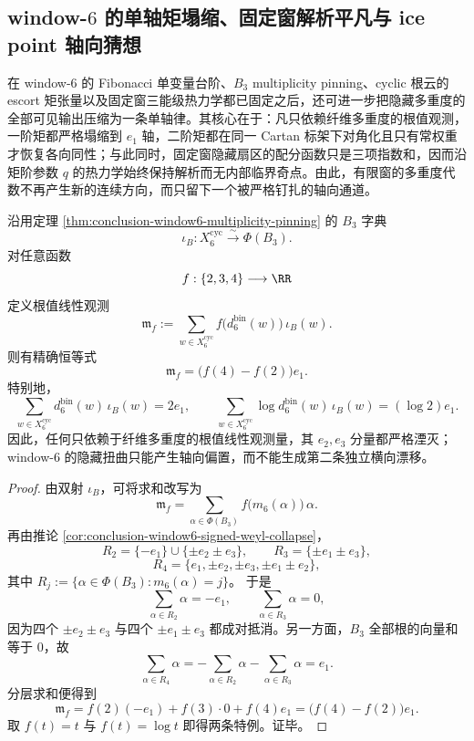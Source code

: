 \subsection{window-\texorpdfstring{$6$}{6} 的单轴矩塌缩、固定窗解析平凡与 ice point 轴向猜想}\label{subsec:conclusion-window6-uniaxial-moment-analyticity-icepoint}

在 window-\(6\) 的 Fibonacci 单变量台阶、\(B_3\) multiplicity pinning、cyclic 根云的 escort 矩张量以及固定窗三能级热力学都已固定之后，还可进一步把隐藏多重度的全部可见输出压缩为一条单轴律。其核心在于：凡只依赖纤维多重度的根值观测，一阶矩都严格塌缩到 \(e_1\) 轴，二阶矩都在同一 Cartan 标架下对角化且只有常权重才恢复各向同性；与此同时，固定窗隐藏扇区的配分函数只是三项指数和，因而沿矩阶参数 \(q\) 的热力学始终保持解析而无内部临界奇点。由此，有限窗的多重度代数不再产生新的连续方向，而只留下一个被严格钉扎的轴向通道。

\begin{theorem}\label{thm:conclusion-window6-arbitrary-multiplicity-first-moment-axis-collapse}
沿用定理 \ref{thm:conclusion-window6-multiplicity-pinning} 的 \(B_3\) 字典
\[
\iota_B:X_6^{\mathrm{cyc}}\xrightarrow{\sim}\Phi(B_3).
\]
对任意函数
\[
f:\{2,3,4\}\longrightarrow \RR
\]
定义根值线性观测
\[
\mathfrak m_f
:=
\sum_{w\in X_6^{\mathrm{cyc}}}
f\!\bigl(d_6^{\mathrm{bin}}(w)\bigr)\,\iota_B(w).
\]
则有精确恒等式
\[
\mathfrak m_f=\bigl(f(4)-f(2)\bigr)e_1.
\]
特别地，
\[
\sum_{w\in X_6^{\mathrm{cyc}}} d_6^{\mathrm{bin}}(w)\,\iota_B(w)=2e_1,
\qquad
\sum_{w\in X_6^{\mathrm{cyc}}} \log d_6^{\mathrm{bin}}(w)\,\iota_B(w)=(\log 2)e_1.
\]
因此，任何只依赖于纤维多重度的根值线性观测量，其 \(e_2,e_3\) 分量都严格湮灭；window-\(6\) 的隐藏扭曲只能产生轴向偏置，而不能生成第二条独立横向漂移。
\end{theorem}
\begin{proof}
由双射 \(\iota_B\)，可将求和改写为
\[
\mathfrak m_f
=
\sum_{\alpha\in\Phi(B_3)} f\!\bigl(m_6(\alpha)\bigr)\,\alpha.
\]
再由推论 \ref{cor:conclusion-window6-signed-weyl-collapse}，
\[
R_2=\{-e_1\}\cup\{\pm e_2\pm e_3\},
\qquad
R_3=\{\pm e_1\pm e_3\},
\]
\[
R_4=\{e_1,\pm e_2,\pm e_3,\pm e_1\pm e_2\},
\]
其中 \(R_j:=\{\alpha\in\Phi(B_3):m_6(\alpha)=j\}\)。
于是
\[
\sum_{\alpha\in R_2}\alpha=-e_1,
\qquad
\sum_{\alpha\in R_3}\alpha=0,
\]
因为四个 \(\pm e_2\pm e_3\) 与四个 \(\pm e_1\pm e_3\) 都成对抵消。另一方面，\(B_3\) 全部根的向量和等于 \(0\)，故
\[
\sum_{\alpha\in R_4}\alpha
=
-\sum_{\alpha\in R_2}\alpha-\sum_{\alpha\in R_3}\alpha
=
e_1.
\]
分层求和便得到
\[
\mathfrak m_f
=
f(2)(-e_1)+f(3)\cdot 0+f(4)e_1
=
\bigl(f(4)-f(2)\bigr)e_1.
\]
取 \(f(t)=t\) 与 \(f(t)=\log t\) 即得两条特例。证毕。
\end{proof}

